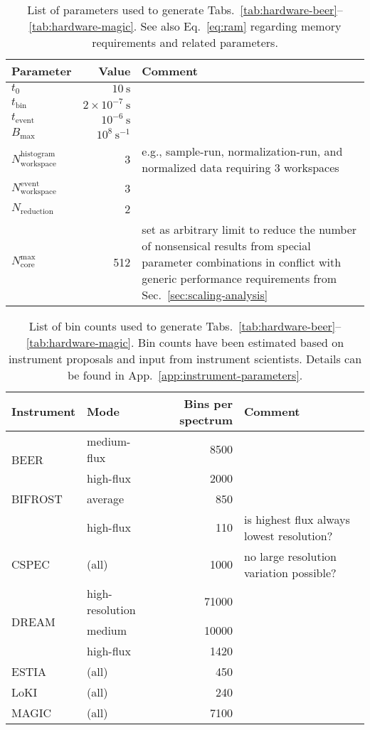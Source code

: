 \documentclass[a4paper,english,numbers=noenddot,bibliography=totoc,chapterprefix=on,DIV=12]{scrartcl}
\newcommand{\Tbin}{t_{\text{bin}}}
\newcommand{\Tevent}{t_{\text{event}}}
\newcommand{\Ncore}{N_{\text{core}}}
\newcommand{\Nreduction}{N_{\text{reduction}}}
\newcommand{\Nworkspace}{N_{\text{workspace}}}
\newcommand{\Bmax}{B_{\text{max}}}
\newcommand{\beer}{BEER\xspace}
\newcommand{\bifrost}{BIFROST\xspace}
\newcommand{\cspec}{CSPEC\xspace}
\newcommand{\dream}{DREAM\xspace}
\newcommand{\estia}{ESTIA\xspace}
\newcommand{\loki}{LoKI\xspace}
\newcommand{\magic}{MAGIC\xspace}
\begin{document}
\begin{table}
  \centering
  \begin{tabular}{lrp{8cm}}
    Parameter & Value & Comment\\
    \hline
    $t_0$ & $10~\mathrm{s}$ \\
    $\Tbin$ & $2\times10^{-7}~\mathrm{s}$ \\
    $\Tevent$ & $10^{-6}~\mathrm{s}$ \\
    $\Bmax$ & $10^8~\mathrm{s}^{-1}$ \\
    $\Nworkspace^{\text{histogram}}$ & 3 & e.g., sample-run, normalization-run, and normalized data requiring 3 workspaces \\
    $\Nworkspace^{\text{event}}$ & 3 \\
    $\Nreduction$ & 2 \\
    $\Ncore^{\text{max}}$ & 512 & set as arbitrary limit to reduce the number of nonsensical results from special parameter combinations in conflict with generic performance requirements from Sec.~\ref{sec:scaling-analysis} \\
    \hline
  \end{tabular}
  \caption{\label{tab:hardware-estimation-parameters}
  List of parameters used to generate Tabs.~\ref{tab:hardware-beer}--\ref{tab:hardware-magic}.
  See also Eq.~\eqref{eq:ram} regarding memory requirements and related parameters.
}
\end{table}

\begin{table}
  \centering
  \begin{tabular}{llrl}
    Instrument & Mode & Bins per spectrum & Comment \\
    \hline
    \hline
    \multirow{2}{*}{\beer}
    & medium-flux & 8500 \\
    & high-flux & 2000 \\
    \hline
    \multirow{1}{*}{\bifrost}
    & average & 850\\
    & high-flux & 110 & is highest flux always lowest resolution?\\
    \hline
    \multirow{1}{*}{\cspec}
    & (all) & 1000 & no large resolution variation possible? \\
    \hline
    \multirow{3}{*}{\dream}
    & high-resolution & 71000 \\
    & medium & 10000 \\
    & high-flux & 1420 \\
    \hline
    \multirow{1}{*}{\estia}
    & (all) & 450 \\
    \hline
    \multirow{1}{*}{\loki}
    & (all)    & 240 \\
    \hline
    \multirow{1}{*}{\magic}
    & (all) & 7100 \\
    \hline
  \end{tabular}
  \caption{\label{tab:resolution}
List of bin counts used to generate Tabs.~\ref{tab:hardware-beer}--\ref{tab:hardware-magic}.
Bin counts have been estimated based on instrument proposals and input from instrument scientists.
Details can be found in App.~\ref{app:instrument-parameters}.
}
\end{table}
\end{document}
